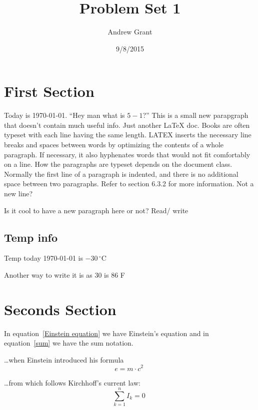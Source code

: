 \documentclass{article}
\title{Problem Set 1}
\author{Andrew Grant}
\date{9/8/2015}
\begin{document}
\tableofcontents

\maketitle

\section{First Section}

Today is \today. \newline
``Hey man what is $5 - 1$?''\newline
This is a small new parapgraph that doesn't contain much useful info. Just another \LaTeX{} doc.
Books are often typeset with each line having the same length. LATEX 
inserts the necessary line breaks and spaces between words by optimizing the contents of a whole paragraph. If necessary, it also hyphenates words that would not fit comfortably on a line. How the paragraphs are typeset depends on the document class. Normally the first line of a paragraph is indented, and there is no additional space between two paragraphs. Refer to section 6.3.2 for more information.
Not a new line? 

Is it cool to have a new paragraph here or not? Read\slash{} write

\subsection{Temp info}

Temp today  \today{} is $-30\, ^{\circ}\mathrm{C}$

Another way to write it is as 30 \textcelsius{} is 86 \textdegree{}F

\section{Seconds Section}

In equation~\ref{Einstein equation} we have Einstein's equation and in equation~\ref{sum} we have the sum notation.

\ldots when Einstein introduced his formula
\begin{equation}
e = m \cdot c^2 \;
\label{Einstein equation}
\end{equation}

\ldots from which follows Kirchhoff's current law:
\begin{equation}
\sum_{k=1}^{n} I_k = 0\;
\label{sum}
\end{equation}
\end{document}
